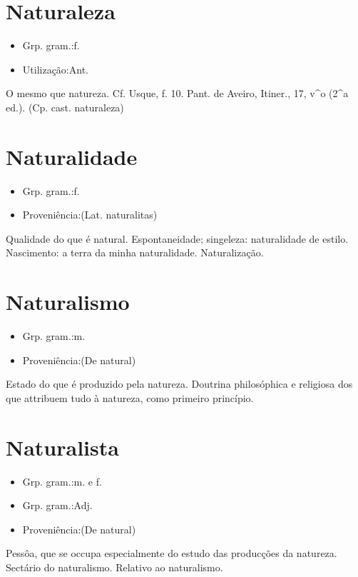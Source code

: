 \section{Naturaleza}
\begin{itemize}
\item {Grp. gram.:f.}
\end{itemize}
\begin{itemize}
\item {Utilização:Ant.}
\end{itemize}
O mesmo que \textunderscore natureza\textunderscore . Cf. Usque, f. 10. Pant. de Aveiro, \textunderscore Itiner.\textunderscore , 17, v^o (2^a ed.).
(Cp. cast. \textunderscore naturaleza\textunderscore )
\section{Naturalidade}
\begin{itemize}
\item {Grp. gram.:f.}
\end{itemize}
\begin{itemize}
\item {Proveniência:(Lat. \textunderscore naturalitas\textunderscore )}
\end{itemize}
Qualidade do que é natural.
Espontaneidade; singeleza: \textunderscore naturalidade de estilo\textunderscore .
Nascimento: \textunderscore a terra da minha naturalidade\textunderscore .
Naturalização.
\section{Naturalismo}
\begin{itemize}
\item {Grp. gram.:m.}
\end{itemize}
\begin{itemize}
\item {Proveniência:(De \textunderscore natural\textunderscore )}
\end{itemize}
Estado do que é produzido pela natureza.
Doutrina philosóphica e religiosa dos que attribuem tudo à natureza, como primeiro princípio.
\section{Naturalista}
\begin{itemize}
\item {Grp. gram.:m.  e  f.}
\end{itemize}
\begin{itemize}
\item {Grp. gram.:Adj.}
\end{itemize}
\begin{itemize}
\item {Proveniência:(De \textunderscore natural\textunderscore )}
\end{itemize}
Pessôa, que se occupa especialmente do estudo das producções da natureza.
Sectário do naturalismo.
Relativo ao naturalismo.
